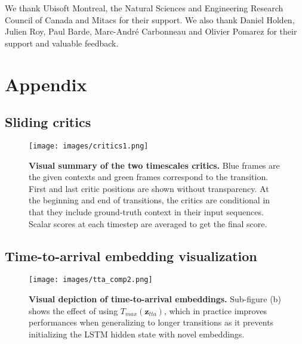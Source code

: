 \documentclass[acmtog]{acmart}
\newcommand{\bz}{\textbf{z}}
\begin{document}
\begin{acks}
We thank Ubisoft Montreal, the Natural Sciences and Engineering Research Council of Canada and Mitacs for their support. We also thank Daniel Holden, Julien Roy, Paul Barde, Marc-André Carbonneau and Olivier Pomarez for their support and valuable feedback.
\end{acks}







\appendix
\section{Appendix}
\subsection{Sliding critics}\label{app:critics}
\vskip -0.4cm
\begin{figure}[H]
\begin{center}
\centerline{\texttt{[image: images/critics1.png]}}
  \caption{\textbf{Visual summary of the two timescales critics.} Blue frames are the given contexts and green frames correspond to the transition. First and last critic positions are shown without transparency. At the beginning and end of transitions, the critics are conditional in that they include ground-truth context in their input sequences. Scalar scores at each timestep are averaged to get the final score.}
  \label{fig:critics}
\end{center}
\vspace{-0.5cm}
\end{figure}

\subsection{Time-to-arrival embedding visualization}\label{app:tta}
\vskip -0.4cm
\begin{figure}[H]
\begin{center}
\centerline{\texttt{[image: images/tta\_comp2.png]}}
  \caption{\textbf{Visual depiction of time-to-arrival embeddings.} Sub-figure (b) shows the effect of using $T_{\mathit{max}}(\bz_{\mathit{tta}})$, which in practice improves performances when generalizing to longer transitions as it prevents initializing the LSTM hidden state with novel embeddings.}
  \label{fig:tta}
\end{center}
\vspace{-0.5cm}
\end{figure}
\end{document}
